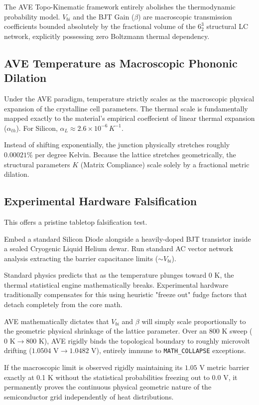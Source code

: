 The AVE Topo-Kinematic framework entirely abolishes the thermodynamic probability model. $V_{bi}$ and the BJT Gain ($\beta$) are macroscopic transmission coefficients bounded absolutely by the fractional volume of the $6^3_2$ structural LC network, explicitly possessing zero Boltzmann thermal dependency.

\subsection{AVE Temperature as Macroscopic Phononic Dilation}
Under the AVE paradigm, temperature strictly scales as the macroscopic physical expansion of the crystalline cell parameters. The thermal scale is fundamentally mapped exactly to the material's empirical coeffecient of linear thermal expansion ($\alpha_{th}$). 
For Silicon, $\alpha_L \approx 2.6 \times 10^{-6} \, K^{-1}$.

Instead of shifting exponentially, the junction physically stretches roughly $0.00021\%$ per degree Kelvin. Because the lattice stretches geometrically, the structural parameters $K$ (Matrix Compliance) scale solely by a fractional metric dilation. 

\subsection{Experimental Hardware Falsification}
This offers a pristine tabletop falsification test.

Embed a standard Silicon Diode alongside a heavily-doped BJT transistor inside a sealed Cryogenic Liquid Helium dewar. Run standard AC vector network analysis extracting the barrier capacitance limits ($\sim V_{bi}$).

Standard physics predicts that as the temperature plunges toward 0 K, the thermal statistical engine mathematically breaks. Experimental hardware traditionally compensates for this using heuristic "freeze out" fudge factors that detach completely from the core math.

AVE mathematically dictates that $V_{bi}$ and $\beta$ will simply scale proportionally to the geometric physical shrinkage of the lattice parameter. Over an $800$ K sweep ($0 \text{ K} \to 800 \text{ K}$), AVE rigidly binds the topological boundary to roughly microvolt drifting ($1.0504\text{ V} \to 1.0482\text{ V}$), entirely immune to \texttt{MATH\_COLLAPSE} exceptions. 

If the macroscopic limit is observed rigidly maintaining its $1.05$ V metric barrier exactly at 0.1 K without the statistical probabilities freezing out to $0.0$ V, it permanently proves the continuous physical geometric nature of the semiconductor grid independently of heat distributions.

